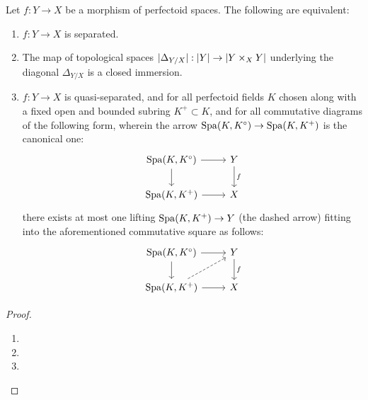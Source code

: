             \begin{theorem} \label{theorem: valuative_criterion_for_separatedness_for_morphisms_of_perfectoid_spaces}
                Let $f: Y \to X$ be a morphism of perfectoid spaces. The following are equivalent:
                    \begin{enumerate}
                        \item $f: Y \to X$ is separated.
                        \item The map of topological spaces $|\Delta_{Y/X}|: |Y| \to |Y \x_X Y|$ underlying the diagonal $\Delta_{Y/X}$ is a closed immersion.
                        \item $f: Y \to X$ is quasi-separated, and for all perfectoid fields $K$ chosen along with a fixed open and bounded subring $K^+ \subset K$, and for all commutative diagrams of the following form, wherein the arrow $\operatorname{Spa}(K, K^{\circ}) \to \operatorname{Spa}(K, K^+)$ is the canonical one:
                            $$
                                \begin{tikzcd}
                                	{\Spa(K, K^{\circ})} & Y \\
                                	{\Spa(K, K^+)} & X
                                	\arrow["f", from=1-2, to=2-2]
                                	\arrow[from=1-1, to=2-1]
                                	\arrow[from=2-1, to=2-2]
                                	\arrow[from=1-1, to=1-2]
                                \end{tikzcd}
                            $$
                        there exists at most one lifting $\operatorname{Spa}(K, K^+) \to Y$ (the dashed arrow) fitting into the aforementioned commutative square as follows:
                            $$
                                \begin{tikzcd}
                                	{\Spa(K, K^{\circ})} & Y \\
                                	{\Spa(K, K^+)} & X
                                	\arrow["f", from=1-2, to=2-2]
                                	\arrow[from=1-1, to=2-1]
                                	\arrow[from=2-1, to=2-2]
                                	\arrow[from=1-1, to=1-2]
                                	\arrow[dashed, from=2-1, to=1-2]
                                \end{tikzcd}
                            $$
                    \end{enumerate}
            \end{theorem}
                \begin{proof}
                    \noindent
                    \begin{enumerate}
                        \item 
                        \item 
                        \item 
                    \end{enumerate}
                \end{proof}
            
